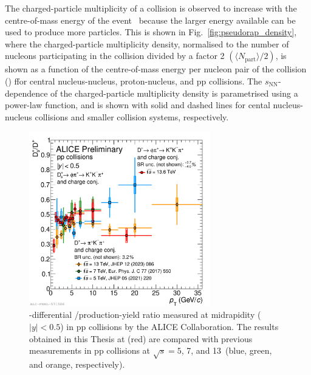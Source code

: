 The charged-particle multiplicity of a collision is observed to increase with the centre-of-mass energy of the event~\cite{ALICE:2015juo,ALICE:2020swj} because the larger energy available can be used to produce more particles. This is shown in Fig.~\ref{fig:pseudorap_density}, where the charged-particle multiplicity density, normalised to the number of nucleons participating in the collision divided by a factor 2 $\left(\langle N_\mathrm{part}\rangle/2\right)$, is shown as a function of the centre-of-mass energy per nucleon pair of the collision (\snn) ffor central nucleus-nucleus, proton-nucleus, and pp collisions. The $s_\mathrm{NN}$-dependence of the charged-particle multiplicity density is parametrised using a power-law function, and is shown with solid and dashed lines for cental nucleus-nucleus collisions and smaller collision systems, respectively.

\begin{figure}[htb]
    \centering
    \includegraphics[width=0.7\textwidth]{Figures/Chapter 7/dsoverdpluscomparisonalice_0.pdf}
    \caption{\pt-differential \ds/\dpl production-yield ratio measured at midrapidity ($\lvert y\rvert<0.5$) in pp collisions by the ALICE Collaboration. The results obtained in this Thesis at \thirteen (red) are compared with previous measurements in pp collisions at $\sqrt{s} = 5$, 7, and 13~\tev (blue, green, and orange, respectively).}
    \label{fig:dsdplvsenergy}
\end{figure}

